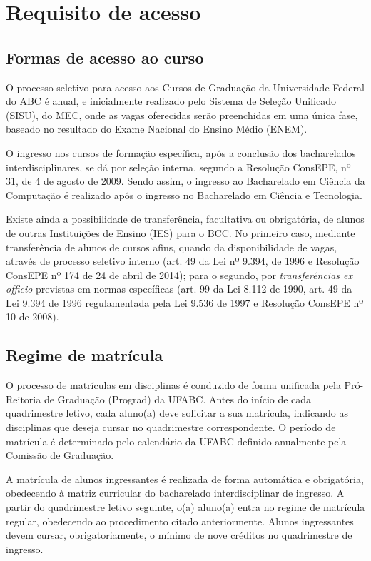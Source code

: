 \section{Requisito de acesso}

\subsection{Formas de acesso ao curso}
O processo seletivo para acesso aos Cursos de Graduação da Universidade Federal
do ABC é anual, e inicialmente realizado pelo Sistema de Seleção Unificado
(SISU), do MEC, onde as vagas oferecidas serão preenchidas em uma única fase,
baseado no resultado do Exame Nacional do Ensino Médio (ENEM).

O ingresso nos cursos de formação específica, após a conclusão dos bacharelados
interdisciplinares, se dá por seleção interna, segundo a Resolução ConsEPE, nº
31, de 4 de agosto de 2009.
Sendo assim, o ingresso ao Bacharelado em Ciência da Computação é realizado
após o ingresso no Bacharelado em Ciência e Tecnologia.

Existe ainda a possibilidade de transferência, facultativa ou obrigatória, de
alunos de outras Instituições de Ensino (IES) para o BCC.
No primeiro caso, mediante transferência de alunos de cursos afins, quando da
disponibilidade de vagas, através de processo seletivo interno (art. 49 da Lei
nº 9.394, de 1996 e Resolução ConsEPE nº 174 de 24 de abril de 2014); para o
segundo, por \textit{transferências ex officio} previstas em normas específicas
(art. 99 da Lei 8.112 de 1990, art. 49 da Lei 9.394 de 1996 regulamentada pela
Lei 9.536 de 1997 e Resolução ConsEPE nº 10 de 2008).

\subsection{Regime de matrícula}

O processo de matrículas em disciplinas é conduzido de forma unificada pela
Pró-Reitoria de Graduação (Prograd) da UFABC.
Antes do início de cada quadrimestre letivo, cada aluno(a) deve solicitar a sua
matrícula, indicando as disciplinas que deseja cursar no quadrimestre
correspondente.
O período de matrícula é determinado pelo calendário da UFABC definido
anualmente pela Comissão de Graduação.

A matrícula de alunos ingressantes é realizada de forma automática e
obrigatória, obedecendo à matriz curricular do bacharelado interdisciplinar de
ingresso.
A partir do quadrimestre letivo seguinte, o(a) aluno(a) entra no regime de
matrícula regular, obedecendo ao procedimento citado anteriormente.
Alunos ingressantes devem cursar, obrigatoriamente, o mínimo de nove créditos
no quadrimestre de ingresso. 

